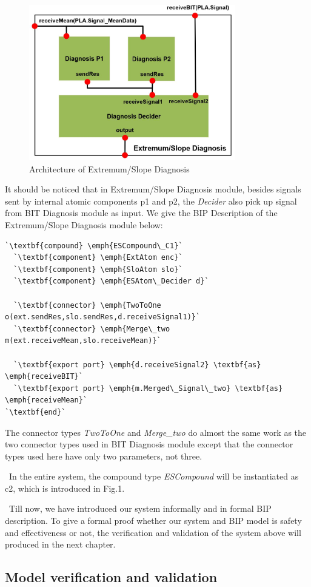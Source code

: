 \begin{figure}[ht!]
	\centering
	\includegraphics[width=90mm]{figure/figure8.jpg}
	\caption{Architecture of Extremum/Slope Diagnosis}
	\label{Ext/Slo_module}
\end{figure}

It should be noticed that in Extremum/Slope Diagnosis module, besides signals sent by internal atomic components p1 and p2, the \emph{Decider} also pick up signal from BIT Diagnosis module as input. We give the BIP Description of the Extremum/Slope Diagnosis module below:

\begin{lstlisting}
`\textbf{compound} \emph{ESCompound\_C1}`
  `\textbf{component} \emph{ExtAtom enc}`
  `\textbf{component} \emph{SloAtom slo}`
  `\textbf{component} \emph{ESAtom\_Decider d}`

  `\textbf{connector} \emph{TwoToOne o(ext.sendRes,slo.sendRes,d.receiveSignal1)}`
  `\textbf{connector} \emph{Merge\_two m(ext.receiveMean,slo.receiveMean)}`

  `\textbf{export port} \emph{d.receiveSignal2} \textbf{as} \emph{receiveBIT}`
  `\textbf{export port} \emph{m.Merged\_Signal\_two} \textbf{as} \emph{receiveMean}`
`\textbf{end}`
\end{lstlisting}

The connector types \emph{TwoToOne} and \emph{Merge\_two} do almost the same work as the two connector types used in BIT Diagnosis module except that the connector types used here have only two parameters, not three.

\
In the entire system, the compound type \emph{ESCompound} will be instantiated as c2, which is introduced in Fig.1.

\
Till now, we have introduced our system informally and in formal BIP description. To give a formal proof whether our system and BIP model is safety and effectiveness or not, the verification and validation of the system above will produced in the next chapter.
\subsection{Model verification and validation}

